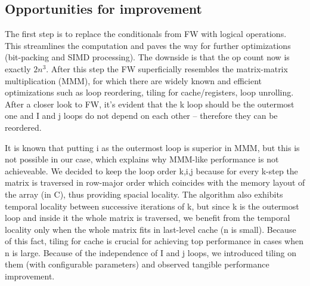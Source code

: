 \documentclass[letterpaper]{article}
\begin{document}
\subsection{Opportunities for improvement}
The first step is to replace the conditionals from FW with logical operations. 
This streamlines the computation and paves the way for further optimizations 
(bit-packing and SIMD processing). The downside is that the op count now is exactly \(2n^3\). 
After this step the FW superficially resembles the matrix-matrix multiplication (MMM), 
for which there are widely known and efficient optimizations such as loop reordering, 
tiling for cache/registers, loop unrolling. After a closer look to FW, it's evident 
that the k loop should be the outermost one and I and j loops do not depend on each 
other -- therefore they can be reordered.

It is known that putting i as the outermost loop is superior in MMM, but this is 
not possible in our case, which explains why MMM-like performance is not achieveable. 
We decided to keep the loop order k,i,j because for every k-step the matrix is traversed 
in row-major order which coincides with the memory layout of the array (in C), 
thus providing spacial locality. The algorithm also exhibits temporal locality 
between successive iterations of k, but since k is the outermost loop and 
inside it the whole matrix is traversed, we benefit from the temporal locality 
only when the whole matrix fits in last-level cache (n is small). Because of 
this fact, tiling for cache is crucial for achieving top performance in cases 
when n is large. Because of the independence of I and j loops, we introduced 
tiling on them (with configurable parameters) and observed tangible performance improvement.
\end{document}
